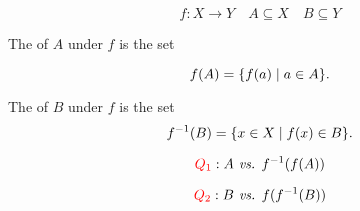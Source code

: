 \begin{frame}{}
  \[
    f: X \to Y \quad A \subseteq X \quad B \subseteq Y
  \]

  \begin{definition}[Image]
    The  of $A$ under $f$ is the set

    \[
      f(A) = \{f(a) \mid a \in A\}.
    \]
  \end{definition}

  \vspace{0.30cm}
  \begin{definition}
    The  of $B$ under $f$ is the set
    \[
      f^{-1}(B) = \{x \in X \mid f(x) \in B\}.
    \]
  \end{definition}
\end{frame}

\begin{frame}{}
  \[
    \textcolor{red}{Q_1}: A \emph{ vs. } f^{-1}(f(A))
  \]

  \[
    \textcolor{red}{Q_2}: B \emph{ vs. } f(f^{-1}(B))
  \]
\end{frame}

\begin{frame}{}
\end{frame}

\begin{frame}{}
\end{frame}

\begin{frame}{}
\end{frame}
